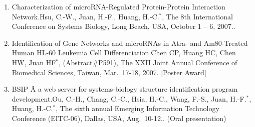 \documentclass[10pt,a4paper]{article}
\def\mypub#1#2#3{{#1.}\newline #2, #3.}
\begin{document}
\begin{enumerate}
\item
\mypub
{Characterization of microRNA-Regulated Protein-Protein Interaction Network}
{Hsu, C.-W., Juan, H.-F., Huang, H.-C.$^{*}$}
{The 8th International Conference on Systems Biology, Long Beach, USA, October 1 -- 6, 2007.}


\item
\mypub
{Identification of Gene Networks and microRNAs in Atra- and Am80-Treated Human HL-60 Leukemia Cell Differenciation}
{Chen CP, Huang HC, Chen HW, Juan HF$^*$}
{(Abstract\#P591), The XXII Joint Annual Conference of Biomedical Sciences, Taiwan, Mar.\ 17-18, 2007}
[Poster Award]


\item
\mypub
{BSIP Ã a web server for systems-biology structure identification program development}
{Ou, C.-H., Chang, C.-C., Hsia, H.-C., Wang, F.-S., Juan, H.-F.$^{*}$, Huang, H.-C.$^{*}$}
{The sixth annual Emerging Information Technology Conference (EITC-06), Dallas, USA, Aug.\ 10-12.} (Oral presentation)


\end{enumerate}
\end{document}
